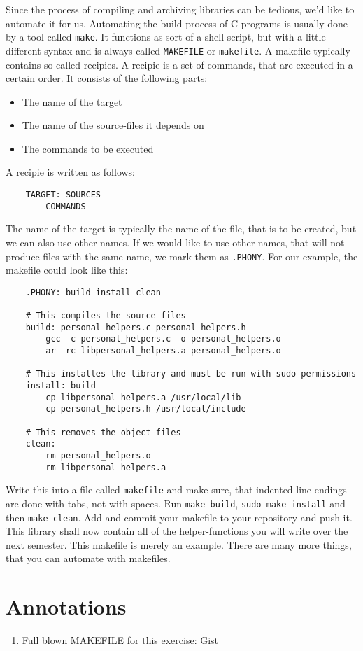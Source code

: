 \documentclass{dcbl/challenge}
\begin{document}
\begin{aufgabe}
    Since the process of compiling and archiving libraries can be tedious, we'd like to automate it for us.
    Automating the build process of C-programs is usually done by a tool called \texttt{make}.
    It functions as sort of a shell-script, but with a little different syntax and is always called \texttt{MAKEFILE} or \texttt{makefile}.
    A makefile typically contains so called recipies. 
    A recipie is a set of commands, that are executed in a certain order.
    It consists of the following parts:
    \begin{itemize}
        \item The name of the target
        \item The name of the source-files it depends on
        \item The commands to be executed
    \end{itemize}
    A recipie is written as follows:
    \begin{lstlisting}
    TARGET: SOURCES
        COMMANDS
    \end{lstlisting}
    The name of the target is typically the name of the file, that is to be created, but we can also use other names.
    If we would like to use other names, that will not produce files with the same name, we mark them as \texttt{.PHONY}.
    For our example, the makefile could look like this:
    \begin{lstlisting}
    .PHONY: build install clean
    
    # This compiles the source-files
    build: personal_helpers.c personal_helpers.h
        gcc -c personal_helpers.c -o personal_helpers.o
        ar -rc libpersonal_helpers.a personal_helpers.o
    
    # This installes the library and must be run with sudo-permissions
    install: build
        cp libpersonal_helpers.a /usr/local/lib
        cp personal_helpers.h /usr/local/include
    
    # This removes the object-files
    clean:
        rm personal_helpers.o
        rm libpersonal_helpers.a
    \end{lstlisting}
    Write this into a file called \texttt{makefile} and make sure, that indented line-endings are done with tabs, not with spaces.
    Run \texttt{make build}, \texttt{sudo make install} and then \texttt{make clean}.
    Add and commit your makefile to your repository and push it.
    This library shall now contain all of the helper-functions you will write over the next semester.
    This makefile is merely an example. 
    There are many more things, that you can automate with makefiles.
\end{aufgabe}


\section*{Annotations}
\begin{enumerate}
    \item Full blown MAKEFILE for this exercise: \href{https://gist.github.com/bjoekeldude/738a19d7309a6cad95d4ae75f1b702a8}{Gist}
\end{enumerate}
\end{document}
